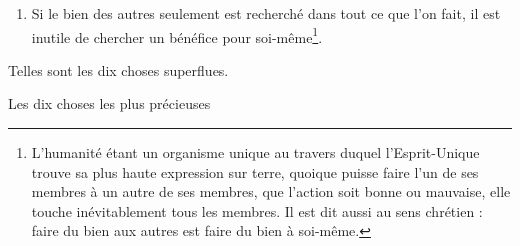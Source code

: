 \documentclass[10pt]{book}
\makeatletter
\renewcommand{\section}{\@startsection{section}{0}{0mm}
   {\baselineskip}
   {\baselineskip}{\normalfont\normalsize\scshape\centering}
}
\makeatother
\begin{document}
\begin{enumerate}[1.-]
\item Si le bien des autres seulement est recherché dans tout ce que l'on fait, il est inutile de chercher un bénéfice pour soi-même\footnote{L'humanité étant un organisme unique au travers duquel l'Esprit-Unique trouve sa plus haute expression sur terre, quoique puisse faire l'un de ses membres à un autre de ses membres, que l'action soit bonne ou mauvaise, elle touche inévitablement tous les membres. Il est dit aussi au sens chrétien : faire du bien aux autres est faire du bien à soi-même.}.
\end{enumerate}
Telles sont les dix choses superflues.

\section{Les dix choses les plus précieuses}
\end{document}
